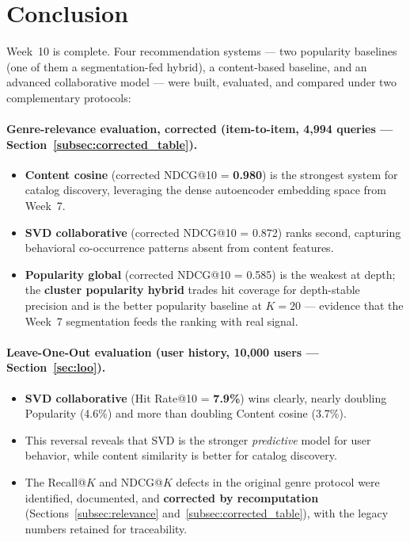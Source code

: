 \documentclass[12pt,a4paper]{article}
\begin{document}
\section{Conclusion}

Week~10 is complete. Four recommendation systems --- two popularity baselines (one of them a
segmentation-fed hybrid), a content-based baseline, and an advanced collaborative model ---
were built, evaluated, and compared under two complementary protocols:

\paragraph{Genre-relevance evaluation, corrected (item-to-item, 4,994 queries --- Section~\ref{subsec:corrected_table}).}
\begin{itemize}[nosep]
  \item \textbf{Content cosine} (corrected NDCG@10 = \textbf{0.980}) is the strongest system
    for catalog discovery, leveraging the dense autoencoder embedding space from Week~7.
  \item \textbf{SVD collaborative} (corrected NDCG@10 = 0.872) ranks second, capturing
    behavioral co-occurrence patterns absent from content features.
  \item \textbf{Popularity global} (corrected NDCG@10 = 0.585) is the weakest at depth; the
    \textbf{cluster popularity hybrid} trades hit coverage for depth-stable precision and is
    the better popularity baseline at $K=20$ --- evidence that the Week~7 segmentation feeds
    the ranking with real signal.
\end{itemize}

\paragraph{Leave-One-Out evaluation (user history, 10,000 users --- Section~\ref{sec:loo}).}
\begin{itemize}[nosep]
  \item \textbf{SVD collaborative} (Hit Rate@10 = \textbf{7.9\%}) wins clearly,
    nearly doubling Popularity (4.6\%) and more than doubling Content cosine (3.7\%).
  \item This reversal reveals that SVD is the stronger \emph{predictive} model for user
    behavior, while content similarity is better for catalog discovery.
  \item The Recall@$K$ and NDCG@$K$ defects in the original genre protocol were identified,
    documented, and \textbf{corrected by recomputation}
    (Sections~\ref{subsec:relevance} and~\ref{subsec:corrected_table}), with the legacy
    numbers retained for traceability.
\end{itemize}
\end{document}
